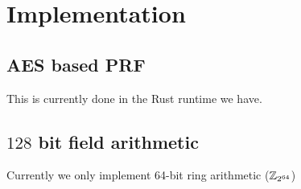 \section{Implementation}

\subsection{AES based PRF}
This is currently done in the Rust runtime we have.

\subsection{$128$ bit field arithmetic}
Currently we only implement 64-bit ring arithmetic ($\mathbb{Z}_{2^{64}}$)

